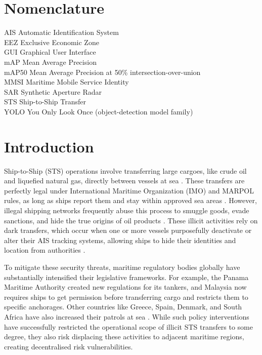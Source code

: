 \documentclass[10pt, letterpaper, twocolumn]{article}
\begin{document}
\section{Nomenclature}

\noindent AIS \quad Automatic Identification System \\
EEZ \quad Exclusive Economic Zone \\
GUI \quad Graphical User Interface \\
mAP \quad Mean Average Precision \\
mAP50 \quad Mean Average Precision at 50\% intersection-over-union \\
MMSI \quad Maritime Mobile Service Identity \\
SAR \quad Synthetic Aperture Radar \\
STS \quad Ship-to-Ship Transfer \\
YOLO \quad You Only Look Once (object-detection model family)


\section{Introduction}

Ship-to-Ship (STS) operations involve transferring large cargoes, like crude oil and liquefied natural gas, directly between vessels at sea \autocite{tokic2021}. These transfers are perfectly legal under International Maritime Organization (IMO) and MARPOL rules, as long as ships report them and stay within approved sea areas \autocite{mepc2010, nawrot2020}. However, illegal shipping networks frequently abuse this process to smuggle goods, evade sanctions, and hide the true origins of oil products \autocite{seto2022, welch2022}. These illicit activities rely on dark transfers, which occur when one or more vessels purposefully deactivate or alter their AIS tracking systems, allowing ships to hide their identities and location from authorities \autocite{miller2018}.

To mitigate these security threats, maritime regulatory bodies globally have substantially intensified their legislative frameworks. For example, the Panama Maritime Authority created new regulations for its tankers, and Malaysia now requires ships to get permission before transferring cargo and restricts them to specific anchorages. Other countries like Greece, Spain, Denmark, and South Africa have also increased their patrols at sea \autocite{cai2026}. While such policy interventions have successfully restricted the operational scope of illicit STS transfers to some degree, they also risk displacing these activities to adjacent maritime regions, creating decentralised risk vulnerabilities.
\end{document}
